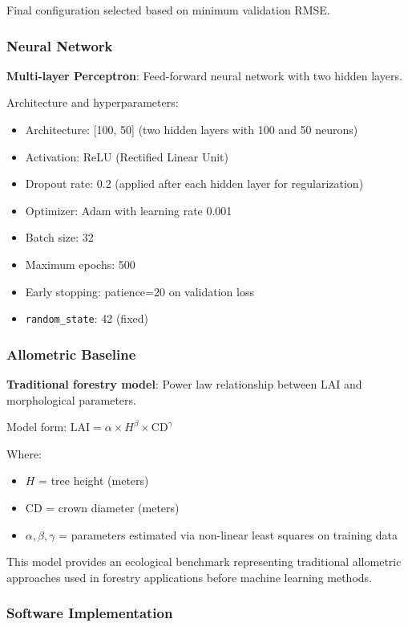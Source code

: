 Final configuration selected based on minimum validation RMSE.

\subsubsection*{Neural Network}

\textbf{Multi-layer Perceptron}: Feed-forward neural network with two hidden layers.

Architecture and hyperparameters:
\begin{itemize}
    \item Architecture: [100, 50] (two hidden layers with 100 and 50 neurons)
    \item Activation: ReLU (Rectified Linear Unit)
    \item Dropout rate: 0.2 (applied after each hidden layer for regularization)
    \item Optimizer: Adam with learning rate 0.001
    \item Batch size: 32
    \item Maximum epochs: 500
    \item Early stopping: patience=20 on validation loss
    \item \texttt{random\_state}: 42 (fixed)
\end{itemize}

\subsubsection*{Allometric Baseline}

\textbf{Traditional forestry model}: Power law relationship between LAI and morphological parameters.

Model form: $\text{LAI} = \alpha \times H^\beta \times \text{CD}^\gamma$

Where:
\begin{itemize}
    \item $H$ = tree height (meters)
    \item $\text{CD}$ = crown diameter (meters)
    \item $\alpha, \beta, \gamma$ = parameters estimated via non-linear least squares on training data
\end{itemize}

This model provides an ecological benchmark representing traditional allometric approaches used in forestry applications before machine learning methods.

\subsubsection*{Software Implementation}

